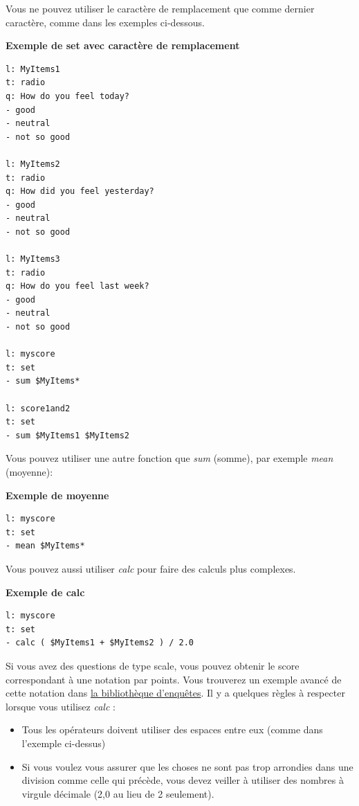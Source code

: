 \documentclass[
]{book}
\providecommand{\tightlist}{%
  \setlength{\itemsep}{0pt}\setlength{\parskip}{0pt}}
\begin{document}
Vous ne pouvez utiliser le caractère de remplacement que comme dernier caractère, comme dans les exemples ci-dessous.

\textbf{Exemple de set avec caractère de remplacement}

\begin{verbatim}
l: MyItems1
t: radio
q: How do you feel today?
- good
- neutral
- not so good

l: MyItems2
t: radio
q: How did you feel yesterday?
- good
- neutral
- not so good

l: MyItems3
t: radio
q: How do you feel last week?
- good
- neutral
- not so good

l: myscore
t: set
- sum $MyItems*

l: score1and2
t: set
- sum $MyItems1 $MyItems2
\end{verbatim}

Vous pouvez utiliser une autre fonction que \emph{sum} (somme), par exemple \emph{mean} (moyenne):

\textbf{Exemple de moyenne}

\begin{verbatim}
l: myscore
t: set
- mean $MyItems*
\end{verbatim}

Vous pouvez aussi utiliser \emph{calc} pour faire des calculs plus complexes.

\textbf{Exemple de calc}

\begin{verbatim}
l: myscore
t: set
- calc ( $MyItems1 + $MyItems2 ) / 2.0
\end{verbatim}

Si vous avez des questions de type scale, vous pouvez obtenir le score correspondant à une notation par points. Vous trouverez un exemple avancé de cette notation dans \href{https://www.psytoolkit.org/survey-library/political-conservatism.html}{la bibliothèque d'enquêtes}. Il y a quelques règles à respecter lorsque vous utilisez \emph{calc} :

\begin{itemize}
\tightlist
\item
  Tous les opérateurs doivent utiliser des espaces entre eux (comme dans l'exemple ci-dessus)
\item
  Si vous voulez vous assurer que les choses ne sont pas trop arrondies dans une division comme celle qui précède, vous devez veiller à utiliser des nombres à virgule décimale (2,0 au lieu de 2 seulement).
\end{itemize}
\end{document}
